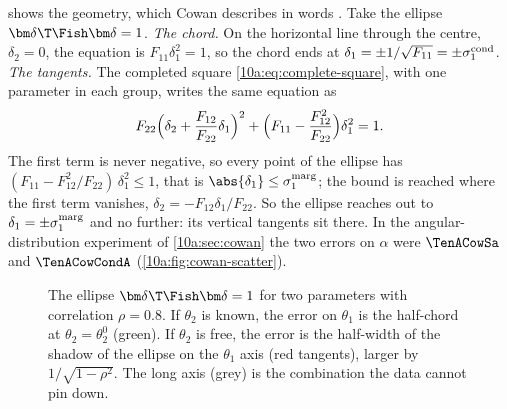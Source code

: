  shows the geometry, which Cowan describes in words . Take the
ellipse $\bm\delta\T\Fish\bm\delta=1$. \emph{The chord.} On the horizontal line through the centre, $\delta_2=0$, the
equation is $F_{11}\delta_1^2=1$, so the chord ends at $\delta_1=\pm1/\sqrt{F_{11}}=\pm\sigma_1^{\rm cond}$. \emph{The
tangents.} The completed square \eqref{10a:eq:complete-square}, with one parameter in each group, writes the same equation as
\[
  F_{22}\Bigl(\delta_2+\frac{F_{12}}{F_{22}}\delta_1\Bigr)^2+\Bigl(F_{11}-\frac{F_{12}^2}{F_{22}}\Bigr)\delta_1^2=1 .
\]
The first term is never negative, so every point of the ellipse has $(F_{11}-F_{12}^2/F_{22})\,\delta_1^2\le1$, that is
$\abs{\delta_1}\le\sigma_1^{\rm marg}$; the bound is reached where the first term vanishes,
$\delta_2=-F_{12}\delta_1/F_{22}$. So the ellipse reaches out to $\delta_1=\pm\sigma_1^{\rm marg}$ and no further: its
vertical tangents sit there. In the angular-distribution experiment of \cref{10a:sec:cowan} the two errors on $\alpha$
were $\TenACowSa$ and $\TenACowCondA$ (\cref{10a:fig:cowan-scatter}).

\begin{figure}[htbp]
\centering
{}
\caption{The ellipse $\bm\delta\T\Fish\bm\delta=1$ for two parameters with correlation $\rho=0.8$. If $\theta_2$ is
known, the error on $\theta_1$ is the half-chord at $\theta_2=\theta_2^0$ (green). If $\theta_2$ is free, the
error is the half-width of the shadow of the ellipse on the $\theta_1$ axis (red tangents), larger by
$1/\sqrt{1-\rho^2}$. The long axis (grey) is the combination the data cannot pin down.}
\label{10a:fig:marg-cond}
\end{figure}

